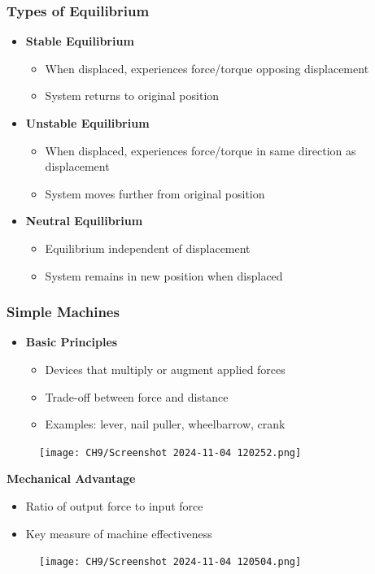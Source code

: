 \documentclass{beamer}
\begin{document}
\begin{frame}
\frametitle{Types of Equilibrium}
\begin{itemize}
    \item \textbf{Stable Equilibrium}
    \begin{itemize}
        \item When displaced, experiences force/torque opposing displacement
        \item System returns to original position
    \end{itemize}
    \item \textbf{Unstable Equilibrium}
    \begin{itemize}
        \item When displaced, experiences force/torque in same direction as displacement
        \item System moves further from original position
    \end{itemize}
    \item \textbf{Neutral Equilibrium}
    \begin{itemize}
        \item Equilibrium independent of displacement
        \item System remains in new position when displaced
    \end{itemize}
\end{itemize}
\end{frame}

\begin{frame}
\frametitle{Simple Machines}
\begin{itemize}
    \item \textbf{Basic Principles}
    \begin{itemize}
        \item Devices that multiply or augment applied forces
        \item Trade-off between force and distance
        \item Examples: lever, nail puller, wheelbarrow, crank
    \end{itemize}
    \end{itemize}
\begin{figure}[H]
    \centering
    \texttt{[image: CH9/Screenshot 2024-11-04 120252.png]}
\end{figure}
    
\end{frame}



\begin{frame}
    \item \textbf{Mechanical Advantage}
    \begin{itemize}
        \item Ratio of output force to input force
        \item Key measure of machine effectiveness
    \end{itemize}
\begin{figure}[H]
    \centering
    \texttt{[image: CH9/Screenshot 2024-11-04 120504.png]}
\end{figure}
    
\end{frame}
\end{document}
